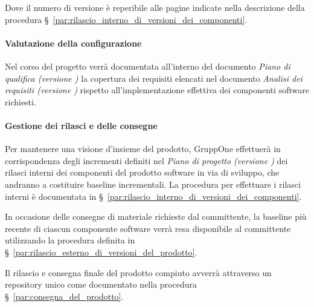\documentclass[../../norme-di-progetto.tex]{subfiles}
\begin{document}
Dove il numero di versione è reperibile alle pagine indicate nella descrizione della procedura §~\ref{par:rilascio_interno_di_versioni_dei_componenti}.


\paragraph{Valutazione della configurazione}%
\label{par:valutazione_della_configurazione}

Nel corso del progetto verrà documentata all'interno del documento \textit{Piano di qualifica (versione \versione)} la copertura dei requisiti elencati nel documento \textit{Analisi dei requisiti (versione \versione)} rispetto all'implementazione effettiva dei componenti software richiesti.


\paragraph{Gestione dei rilasci e delle consegne}%
\label{par:gestione_dei_rilasci_e_delle_consegne}

Per mantenere una visione d'insieme del prodotto, GruppOne effettuerà in corrispondenza degli incrementi definiti nel \textit{Piano di progetto (versione \versione)} dei rilasci interni dei componenti del prodotto software in via di sviluppo, che andranno a costituire baseline incrementali. La procedura per effettuare i rilasci interni è documentata in §~\ref{par:rilascio_interno_di_versioni_dei_componenti}.

In occasione delle consegne di materiale richieste dal committente, la baseline più recente di ciascun componente software verrà resa disponibile al committente utilizzando la procedura definita in §~\ref{par:rilascio_esterno_di_versioni_del_prodotto}.

Il rilascio e consegna finale del prodotto compiuto avverrà attraverso un repository unico come documentato nella procedura §~\ref{par:consegna_del_prodotto}.


\end{document}
